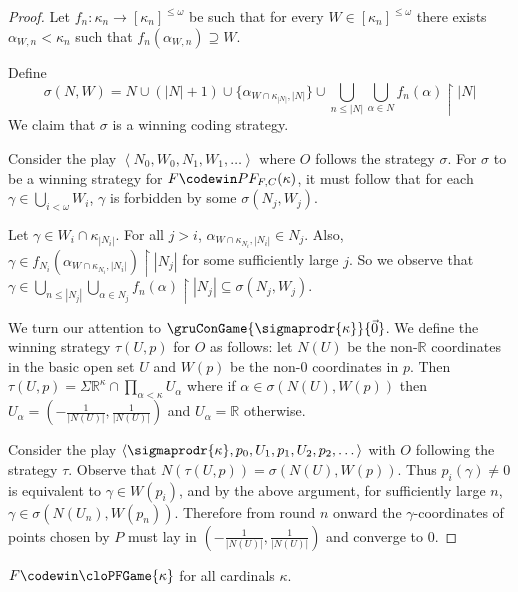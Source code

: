 \begin{proof}
Let $f_n:\kappa_n\to[\kappa_n]^{\leq\omega}$ be such that for every $W\in[\kappa_n]^{\leq\omega}$ there exists $\alpha_{W,n}<\kappa_n$ such that $f_n(\alpha_{W,n})\supseteq W$.

Define \[\sigma(N,W)=N\cup(|N|+1)\cup\{\alpha_{W\cap \kappa_{|N|},|N|}\}\cup\bigcup_{n\leq|N|}\bigcup_{\alpha\in N} f_n(\alpha)\restriction |N|\] We claim that $\sigma$ is a winning coding strategy.

Consider the play $\left<N_0,W_0,N_1,W_1,\dots\right>$ where $O$ follows the strategy $\sigma$. For $\sigma$ to be a winning strategy for $F \codewin PF_{F,C}(\kappa)$, it must follow that for each $\gamma\in\bigcup_{i<\omega}W_i$, $\gamma$ is forbidden by some $\sigma(N_j,W_j)$.

Let $\gamma\in W_i\cap \kappa_{|N_i|}$. For all $j>i$, $\alpha_{W\cap\kappa_{N_i},|N_i|}\in N_j$. Also, $\gamma \in f_{N_i}(\alpha_{W\cap\kappa_{N_i},|N_i|})\restriction|N_j|$ for some sufficiently large $j$. So we observe that $\gamma \in \bigcup_{n\leq|N_j|}\bigcup_{\alpha\in N_j} f_n(\alpha)\restriction |N_j|\subseteq \sigma(N_j,W_j)$.

We turn our attention to $\gruConGame{\sigmaprodr{\kappa}}{\vec{0}}$. We define the winning strategy $\tau(U,p)$ for $O$ as follows: let $N(U)$ be the non-$\mathbb{R}$ coordinates in the basic open set $U$ and $W(p)$ be the non-$0$ coordinates in $p$. Then $\tau(U,p) =\Sigma\mathbb{R}^\kappa \cap \prod_{\alpha<\kappa} U_\alpha$ where if $\alpha \in \sigma(N(U),W(p))$ then $U_\alpha = (-\frac{1}{|N(U)|},\frac{1}{|N(U)|})$ and $U_\alpha=\mathbb{R}$ otherwise.

Consider the play $\left<\sigmaprodr{\kappa},p_0,U_1,p_1,U_2,p_2,\dots\right>$ with $O$ following the strategy $\tau$. Observe that $N(\tau(U,p))=\sigma(N(U),W(p))$. Thus $p_i(\gamma)\not=0$ is equivalent to $\gamma \in W(p_i)$, and by the above argument, for sufficiently large $n$, $\gamma \in \sigma(N(U_n),W(p_n))$. Therefore from round $n$ onward the $\gamma$-coordinates of points chosen by $P$ must lay in $(-\frac{1}{|N(U)|},\frac{1}{|N(U)|})$ and converge to $0$.
\end{proof}

\begin{thm}
$F\codewin\cloPFGame{\kappa}$ for all cardinals $\kappa$.
\end{thm}

